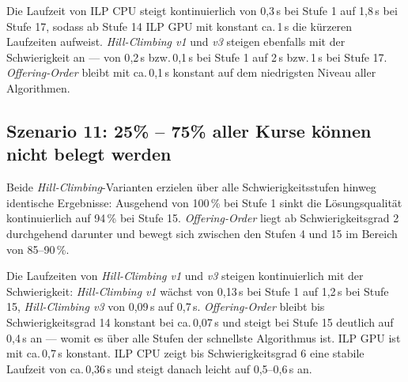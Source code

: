 \vspace{1cm}

\newpage

Die Laufzeit von ILP CPU steigt kontinuierlich von 0{,}3\,s bei Stufe 1 auf 1{,}8\,s bei
Stufe 17, sodass ab Stufe 14 ILP GPU mit konstant ca.\,1\,s die kürzeren Laufzeiten aufweist.
\textit{Hill-Climbing v1} und \textit{v3} steigen ebenfalls mit der Schwierigkeit an --- von
0{,}2\,s bzw.\,0{,}1\,s bei Stufe 1 auf 2\,s bzw.\,1\,s bei Stufe 17. \textit{Offering-Order}
bleibt mit ca.\,0{,}1\,s konstant auf dem niedrigsten Niveau aller Algorithmen.

\vspace{1cm}

\newpage


\subsection{Szenario 11: 25\% -- 75\% aller Kurse können nicht belegt werden}

Beide \textit{Hill-Climbing}-Varianten erzielen über alle Schwierigkeitsstufen hinweg
identische Ergebnisse: Ausgehend von 100\,\% bei Stufe 1 sinkt die Lösungsqualität
kontinuierlich auf 94\,\% bei Stufe 15. \textit{Offering-Order} liegt ab Schwierigkeitsgrad 2
durchgehend darunter und bewegt sich zwischen den Stufen 4 und 15 im Bereich von 85--90\,\%.

\vspace{1cm}

\newpage

Die Laufzeiten von \textit{Hill-Climbing v1} und \textit{v3} steigen kontinuierlich mit der
Schwierigkeit: \textit{Hill-Climbing v1} wächst von 0{,}13\,s bei Stufe 1 auf 1{,}2\,s bei
Stufe 15, \textit{Hill-Climbing v3} von 0{,}09\,s auf 0{,}7\,s. \textit{Offering-Order} bleibt
bis Schwierigkeitsgrad 14 konstant bei ca.\,0{,}07\,s und steigt bei Stufe 15 deutlich auf
0{,}4\,s an --- womit es über alle Stufen der schnellste Algorithmus ist. ILP GPU ist mit
ca.\,0{,}7\,s konstant. ILP CPU zeigt bis Schwierigkeitsgrad 6 eine stabile Laufzeit von
ca.\,0{,}36\,s und steigt danach leicht auf 0{,}5--0{,}6\,s an.

\vspace{1cm}

